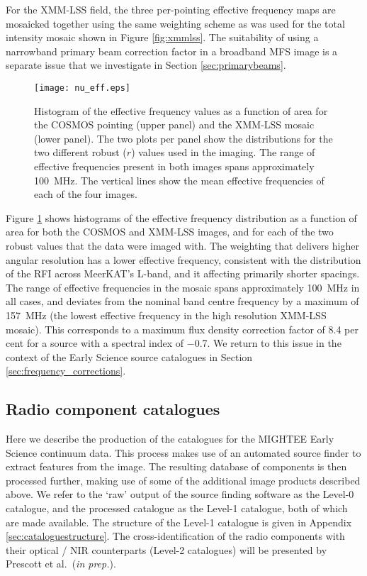 \documentclass[usenatbib,usedcolumn]{mnras}
\begin{document}
For the XMM-LSS field, the three per-pointing effective frequency maps are mosaicked together using the same weighting scheme as was used for the total intensity mosaic shown in Figure \ref{fig:xmmlss}. The suitability of using a narrowband primary beam correction factor in a broadband MFS image is a separate issue that we investigate in Section \ref{sec:primarybeams}.

\begin{figure}
 \texttt{[image: nu\_eff.eps]}
 \caption{Histogram of the effective frequency values as a function of area for the COSMOS pointing (upper panel) and the XMM-LSS mosaic (lower panel). The two plots per panel show the distributions for the two different robust ($r$) values used in the imaging. The range of effective frequencies present in both images spans approximately 100~MHz. The vertical lines show the mean effective frequencies of each of the four images.}
 \label{fig:nu_eff}
\end{figure}

Figure \ref{fig:nu_eff} shows histograms of the effective frequency distribution as a function of area for both the COSMOS and XMM-LSS images, and for each of the two robust values that the data were imaged with. The weighting that delivers higher angular resolution has a lower effective frequency, consistent with the distribution of the RFI across MeerKAT's L-band, and it affecting primarily shorter spacings. The range of effective frequencies in the mosaic spans approximately 100~MHz in all cases, and deviates from the nominal band centre frequency by a maximum of 157~MHz (the lowest effective frequency in the high resolution XMM-LSS mosaic). This corresponds to a maximum flux density correction factor of 8.4 per cent for a source with a spectral index of $-$0.7. We return to this issue in the context of the Early Science source catalogues in Section \ref{sec:frequency_corrections}.

\subsection{Radio component catalogues}
\label{sec:catalogues}

Here we describe the production of the catalogues for the MIGHTEE Early Science continuum data. This process makes use of an automated source finder to extract features from the image. The resulting database of components is then processed further, making use of some of the additional image products described above. We refer to the `raw' output of the source finding software as the Level-0 catalogue, and the processed catalogue as the Level-1 catalogue, both of which are made available. The structure of the Level-1 catalogue is given in Appendix \ref{sec:cataloguestructure}. The cross-identification of the radio components with their optical / NIR counterparts (Level-2 catalogues) will be presented by Prescott et al.~(\emph{in prep.}).
\end{document}
